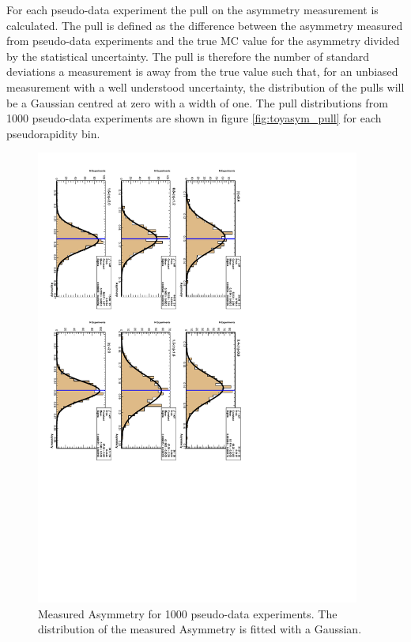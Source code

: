 For each pseudo-data experiment the pull on the asymmetry measurement is
calculated. The pull is defined as the difference between the asymmetry measured
from pseudo-data experiments and the true MC value for the asymmetry divided by
the statistical uncertainty. The pull is therefore the number of standard
deviations a measurement is away from the true value such that, for an unbiased
measurement with a well understood uncertainty, the distribution of the pulls
will be a Gaussian centred at zero with a width of one.
The pull distributions from 1000 pseudo-data experiments are shown in figure
\ref{fig:toyasym_pull} for each pseudorapidity bin.

\begin{figure}[htbp]
  \begin{center}
    \includegraphics*[angle=90,width=0.95\textwidth]{toyasym.pdf}
    \caption{\label{fig:toyasym}Measured Asymmetry for 1000 pseudo-data experiments. The distribution of the measured Asymmetry is fitted with a Gaussian.}
  \end{center}
\end{figure}

